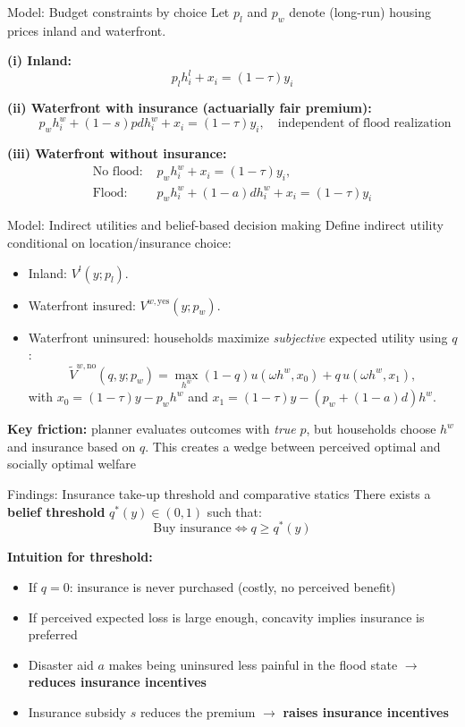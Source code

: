 \documentclass[xcolor=dvipsnames, aspectratio = 169]{beamer}
\begin{document}
{%
\begin{frame}{Model: Budget constraints by choice}
Let $p_l$ and $p_w$ denote (long-run) housing prices inland and waterfront.

\medskip
\textbf{(i) Inland:}
\[
p_l h_i^l + x_i = (1-\tau) y_i
\]

\textbf{(ii) Waterfront with insurance (actuarially fair premium):}
\[
\qquad p_w h_i^w + (1-s)p d h_i^w + x_i = (1-\tau) y_i, \quad \text{independent of flood realization}
\]

\textbf{(iii) Waterfront without insurance:}
\[
\begin{aligned}
\text{No flood: } & p_w h_i^w + x_i = (1-\tau)y_i,\\
\text{Flood: } & p_w h_i^w + (1-a)d h_i^w + x_i = (1-\tau) y_i
\end{aligned}
\]
\end{frame}

\begin{frame}{Model: Indirect utilities and belief-based decision making}
Define indirect utility conditional on location/insurance choice:

\begin{itemize}
  \item Inland: $V^l(y; p_l)$.
  \item Waterfront insured: $V^{w,\text{yes}}(y; p_w)$.
  \item Waterfront uninsured: households maximize \emph{subjective} expected utility using $q$:
  \[
  \tilde V^{w,\text{no}}(q,y; p_w) = \max_{h^w} (1-q)u(\omega h^w, x_0) + q\,u(\omega h^w, x_1),
  \]
  with $x_0=(1-\tau)y - p_w h^w$ and $x_1=(1-\tau)y-(p_w+(1-a)d)h^w$.
\end{itemize}

\medskip
\textbf{Key friction:} planner evaluates outcomes with \emph{true} $p$, but households choose $h^w$ and insurance based on $q$. This creates a wedge between perceived optimal and socially optimal welfare

\end{frame}

\begin{frame}{Findings: Insurance take-up threshold and comparative statics}
There exists a \textbf{belief threshold} $q^*(y)\in(0,1)$ such that:
\[
\text{Buy insurance} \iff q \ge q^*(y)
\]

\smallskip
\textbf{Intuition for threshold:}
\begin{itemize}
  \item If $q=0$: insurance is never purchased (costly, no perceived benefit)
  \item If perceived expected loss is large enough, concavity implies insurance is preferred
  \item Disaster aid $a$ makes being uninsured less painful in the flood state $\rightarrow$ \textbf{reduces insurance incentives}
  \item Insurance subsidy $s$ reduces the premium $\rightarrow$ \textbf{raises insurance incentives}
\end{itemize}


\end{frame}}
\end{document}
